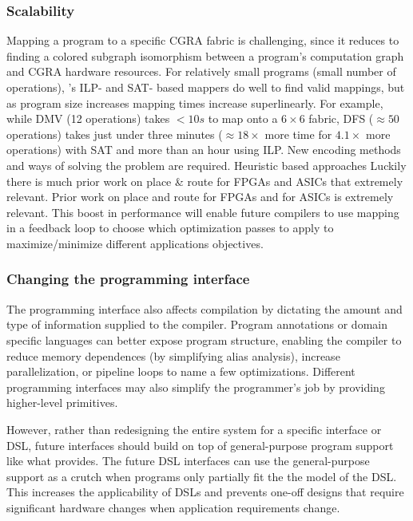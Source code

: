 \subsubsection{Scalability}
Mapping a program to a specific CGRA fabric is challenging, since it reduces to finding a colored subgraph isomorphism between a program's computation graph and CGRA hardware resources.
% 
For relatively small programs (small number of operations), \riptide's ILP- and SAT- based mappers do well to find valid mappings, but as program size increases mapping times increase superlinearly.
% 
For example, while DMV (12 operations) takes $<10s$ to map onto a $6\times6$ fabric, DFS ($\approx 50$ operations) takes just under three minutes ($\approx 18\times$ more time for $4.1\times$ more operations) with SAT and more than an hour using ILP.
% 
New encoding methods and ways of solving the problem are required.
% 
% 
% 
Heuristic based approaches 
Luckily there is much prior work on place \& route for FPGAs and ASICs that extremely relevant.
% 
Prior work on place and route for FPGAs and for ASICs is extremely relevant.
%
% 
This boost in performance will enable future compilers to use mapping in a feedback loop to choose which optimization passes to apply to maximize/minimize different applications objectives.

\subsubsection{Changing the programming interface}
The programming interface also affects compilation by dictating the amount and type of information supplied to the compiler.
% 
Program annotations or domain specific languages can better expose program structure, enabling the compiler to reduce memory dependences (by simplifying alias analysis), increase parallelization, or pipeline loops to name a few optimizations. 
% 
Different programming interfaces may also simplify the programmer's job by providing higher-level primitives.

However, rather than redesigning the entire system for a specific interface or DSL, future interfaces should build on top of general-purpose program support like what \riptide provides.
% 
The future DSL interfaces can use the general-purpose support as a crutch when programs only partially fit the the model of the DSL.
% 
This increases the applicability of DSLs and prevents one-off designs that require significant hardware changes when application requirements change.

